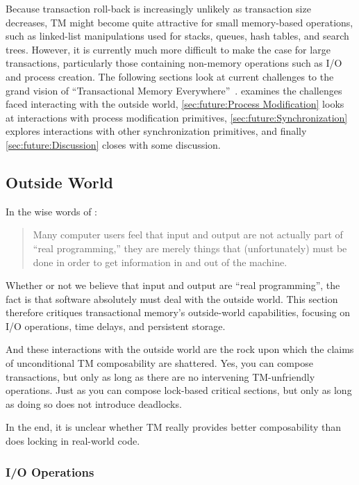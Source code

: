 Because transaction roll-back is increasingly unlikely as transaction
size decreases, TM might become quite attractive for small memory-based
operations,
such as linked-list manipulations used for stacks, queues, hash tables,
and search trees.
However, it is currently much more difficult to make the case for large
transactions, particularly those containing non-memory operations such
as I/O and process creation.
The following sections look at current challenges to the grand vision of
``Transactional Memory Everywhere''~\cite{PaulEMcKenney2009TMeverywhere}.
 examines the challenges faced
interacting with the outside world,
\cref{sec:future:Process Modification} looks at interactions
with process modification primitives,
\cref{sec:future:Synchronization} explores interactions with
other synchronization primitives, and finally
\cref{sec:future:Discussion} closes with some discussion.

\subsection{Outside World}
\label{sec:future:Outside World}

In the wise words of :

\begin{quote}
	Many computer users feel that input and output are not actually part
	of ``real programming,'' they are merely things that (unfortunately)
	must be done in order to get information in and out of the machine.
\end{quote}

Whether or not we believe that input and output are ``real programming'',
the fact is that software absolutely must deal with the outside world.
This section therefore critiques transactional memory's outside-world
capabilities, focusing on I/O operations, time delays, and persistent
storage.

And these interactions with the outside world are the rock upon which
the claims of unconditional TM composability are shattered.
Yes, you can compose transactions, but only as long as there are no
intervening TM-unfriendly operations.
Just as you can compose lock-based critical sections, but only as long
as doing so does not introduce deadlocks.

In the end, it is unclear whether TM really provides better composability
than does locking in real-world code.

\subsubsection{I/O Operations}
\label{sec:future:I/O Operations}

